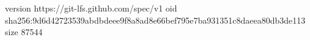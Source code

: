version https://git-lfs.github.com/spec/v1
oid sha256:9d6d42723539abdbdeee9f8a8ad8e66bef795e7ba931351c8daeea80db3de113
size 87544
